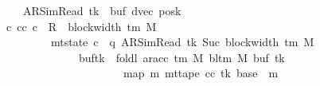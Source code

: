 \begin{isabellebody}
\ \ \ \ \ \ \ \ \ \ \ \ \ \ \ \ \ \ \ {\isacharparenleft}{\kern0pt}AR{\isacharunderscore}{\kern0pt}SimRead{\isacharcomma}{\kern0pt}\ tk{\isacharcomma}{\kern0pt}\ {}{\isacharcomma}{\kern0pt}\ buf{}{\isacharprime}{\kern0pt}{\isacharcomma}{\kern0pt}\ dvec{\isacharcomma}{\kern0pt}\ posk{\isacharprime}{\kern0pt}{\isacharparenright}{\kern0pt}\ {\isasymrbrakk}\isanewline
\ \ \ \ \ \ \ \ \ \ \ \ \ \ \ {\isasymLongrightarrow}\ {\isasymexists}c{\isacharprime}{\kern0pt}{\isacharprime}{\kern0pt}{\isachardot}{\kern0pt}\ {\isacharparenleft}{\kern0pt}cc{\isacharcomma}{\kern0pt}\ c{\isacharprime}{\kern0pt}{\isacharprime}{\kern0pt}{\isacharparenright}{\kern0pt}\ {\isasymin}\ R{\isacharprime}{\kern0pt}\ {\isacharcircum}{\kern0pt}{\isacharcircum}{\kern0pt}\ {\isacharparenleft}{\kern0pt}block{\isacharunderscore}{\kern0pt}width\ {\isacharparenleft}{\kern0pt}{\isasymGamma}{\isacharunderscore}{\kern0pt}tm\ M{\isacharparenright}{\kern0pt}\ {\isacharminus}{\kern0pt}\ {}{\isacharparenright}{\kern0pt}\isanewline
\ \ \ \ \ \ \ \ \ \ \ \ \ \ \ \ \ \ \ \ \ \ \ {\isasymand}\ mt{\isacharunderscore}{\kern0pt}state\ c{\isacharprime}{\kern0pt}{\isacharprime}{\kern0pt}\ {\isacharequal}{\kern0pt}\ {\isacharparenleft}{\kern0pt}q{\isacharcomma}{\kern0pt}\ AR{\isacharunderscore}{\kern0pt}SimRead{\isacharcomma}{\kern0pt}\ tk{\isacharcomma}{\kern0pt}\ Suc\ {\isacharparenleft}{\kern0pt}block{\isacharunderscore}{\kern0pt}width\ {\isacharparenleft}{\kern0pt}{\isasymGamma}{\isacharunderscore}{\kern0pt}tm\ M{\isacharparenright}{\kern0pt}{\isacharparenright}{\kern0pt}{\isacharcomma}{\kern0pt}\isanewline
\ \ \ \ \ \ \ \ \ \ \ \ \ \ \ \ \ \ \ \ \ \ \ \ \ \ \ \ \ buf{}{\isacharprime}{\kern0pt}{\isacharparenleft}{\kern0pt}tk\ {\isacharcolon}{\kern0pt}{\isacharequal}{\kern0pt}\ foldl\ {\isacharparenleft}{\kern0pt}ar{\isacharunderscore}{\kern0pt}acc\ {\isacharparenleft}{\kern0pt}{\isasymGamma}{\isacharunderscore}{\kern0pt}tm\ M{\isacharparenright}{\kern0pt}\ {\isacharparenleft}{\kern0pt}bl{\isacharunderscore}{\kern0pt}tm\ M{\isacharparenright}{\kern0pt}{\isacharparenright}{\kern0pt}\ {\isacharparenleft}{\kern0pt}buf{}{\isacharprime}{\kern0pt}\ tk{\isacharparenright}{\kern0pt}\isanewline
\ \ \ \ \ \ \ \ \ \ \ \ \ \ \ \ \ \ \ \ \ \ \ \ \ \ \ \ \ \ \ \ \ \ \ \ \ {\isacharparenleft}{\kern0pt}map\ {\isacharparenleft}{\kern0pt}{\isasymlambda}m{\isachardot}{\kern0pt}\ mt{\isacharunderscore}{\kern0pt}tape\ cc\ tk\ {\isacharparenleft}{\kern0pt}base{\isacharprime}{\kern0pt}\ {\isacharplus}{\kern0pt}\ m{\isacharparenright}{\kern0pt}{\isacharparenright}{\kern0pt}\isanewline

\end{isabellebody}
